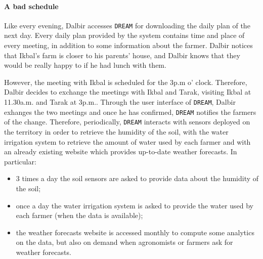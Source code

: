 \documentclass{article}
\begin{document}
\paragraph{A bad schedule}
Like every evening, Dalbir accesses \verb|DREAM| for downloading the daily plan of the next day. Every daily plan provided by the system contains time and place of every meeting, in addition to some information about the farmer. Dalbir notices that Ikbal's farm is closer to his parents' house, and Dalbir knows that they would be really happy to if he had lunch with them.\par
\noindent However, the meeting with Ikbal is scheduled for the 3p.m o' clock. Therefore, Dalbir decides to exchange the meetings with Ikbal and Tarak, visiting Ikbal at 11.30a.m. and Tarak at 3p.m.. Through the user interface of \verb|DREAM|, Dalbir exhanges the two meetings and once he has confirmed, \verb|DREAM| notifies the farmers of the change.
\noindent Therefore, periodically, \verb|DREAM| interacts with sensors deployed on the territory in order to retrieve the humidity of the soil, with the water irrigation system to retrieve the amount of water used by each farmer and with an already existing website which provides up-to-date weather forecasts. In particular:
\begin{itemize}
    \item 3 times a day the soil sensors are asked to provide data about the humidity of the soil;
    \item once a day the water irrigation system is asked to provide the water used by each farmer (when the data is available);
    \item the weather forecasts website is accessed monthly to compute some analytics on the data, but also on demand when agronomists or farmers ask for weather forecasts.
\end{itemize}
\end{document}

